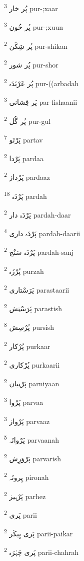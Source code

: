 \documentclass[12pt]{article}
\begin{document}
\begin{RTL}
\begin{multicols}{5}
{\ur پُر خار}   \textsuperscript{3} pur-;xaar

{\ur پُر خُون}   \textsuperscript{3} pur-;xuun

{\ur پُر شِکَن}   \textsuperscript{2} pur-shikan

{\ur پُر شور}   \textsuperscript{2} pur-shor

{\ur پُر عَرْبَدَہ}   \textsuperscript{2} pur-((arbadah

{\ur پَر فِشانی}   \textsuperscript{3} par-fishaanii

{\ur پُر گُل}   \textsuperscript{2} pur-gul

{\ur پَرْتَو}   \textsuperscript{7} partav

{\ur پَرْدا}   \textsuperscript{2} pardaa

{\ur پَرْداز}   \textsuperscript{2} pardaaz

{\ur پَرْدَہ}   \textsuperscript{18} pardah

{\ur پَرْدَہ دار}   \textsuperscript{2} pardah-daar

{\ur پَرْدَہ داری}   \textsuperscript{4} pardah-daarii

{\ur پَرْدَہ سَنْج}   \textsuperscript{2} pardah-sanj

{\ur پُرْزَہ}   \textsuperscript{2} purzah

{\ur پَرَسْتاری}   \textsuperscript{2} parastaarii

{\ur پَرَسْتِش}   \textsuperscript{2} parastish

{\ur پُرْسِش}   \textsuperscript{8} pursish

{\ur پُرْکار}   \textsuperscript{2} purkaar

{\ur پُرْکاری}   \textsuperscript{2} purkaarii

{\ur پَرْنِیان}   \textsuperscript{2} parniyaan

{\ur پَرْوا}   \textsuperscript{3} parvaa

{\ur پَرْواز}   \textsuperscript{3} parvaaz

{\ur پَرْوانَہ}   \textsuperscript{5} parvaanah

{\ur پَرْوَرِش}   \textsuperscript{2} parvarish

{\ur پِرونَہ}   \textsuperscript{2} pironah

{\ur پَرْہیز}   \textsuperscript{2} parhez

{\ur پَری}   \textsuperscript{2} parii

{\ur پَری پِیکَر}   \textsuperscript{2} parii-paikar

{\ur پَری چَہْرَہ}   \textsuperscript{2} parii-chahrah


\end{multicols}
\end{RTL}
\end{document}
